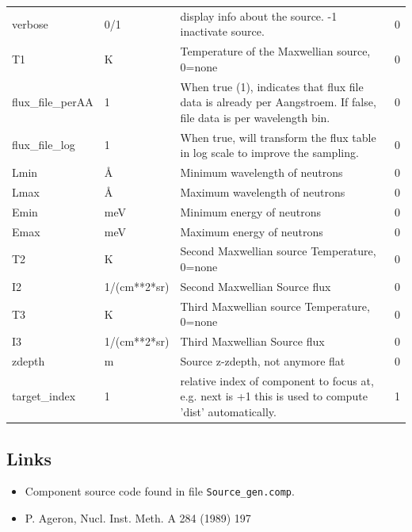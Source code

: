 \begin{longtable}{p{}p{}p{}p{}}
verbose & 0/1 & display info about the source. -1 inactivate source. & 0 \\
T1 & K & Temperature of the Maxwellian source, 0=none & 0 \\
flux\_file\_perAA & 1 & When true (1), indicates that flux file data is already per Aangstroem. If false, file data is per wavelength bin. & 0 \\
flux\_file\_log & 1 & When true, will transform the flux table in log scale to improve the sampling. & 0 \\
Lmin & \AA{} & Minimum wavelength of neutrons & 0 \\
Lmax & \AA{} & Maximum wavelength of neutrons & 0 \\
Emin & meV & Minimum energy of neutrons & 0 \\
Emax & meV & Maximum energy of neutrons & 0 \\
T2 & K & Second Maxwellian source Temperature, 0=none & 0 \\
I2 & 1/(cm**2*sr) & Second Maxwellian Source flux & 0 \\
T3 & K & Third Maxwellian source Temperature, 0=none & 0 \\
I3 & 1/(cm**2*sr) & Third Maxwellian Source flux & 0 \\
zdepth & m & Source z-zdepth, not anymore flat & 0 \\
target\_index & 1 & relative index of component to focus at, e.g. next is +1 this is used to compute 'dist' automatically. & 1 \\
\bottomrule
\end{longtable}

\subsection*{Links}
\begin{itemize}
  \item Component source code found in file \texttt{Source\_gen.comp}.
  \item P. Ageron, Nucl. Inst. Meth. A 284 (1989) 197
\end{itemize}
